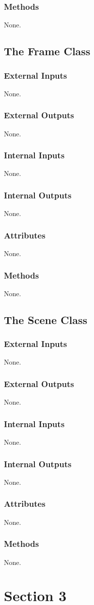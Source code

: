 \documentclass[]{DINOReportMemo}
\begin{document}
\subsubsection{Methods}
None.

\subsection{The Frame Class}
\subsubsection{External Inputs}
None.
\subsubsection{External Outputs}
None.
\subsubsection{Internal Inputs}
None.
\subsubsection{Internal Outputs}
None.
\subsubsection{Attributes}
None.
\subsubsection{Methods}
None.

\subsection{The Scene Class}
\subsubsection{External Inputs}
None.
\subsubsection{External Outputs}
None.
\subsubsection{Internal Inputs}
None.
\subsubsection{Internal Outputs}
None.
\subsubsection{Attributes}
None.
\subsubsection{Methods}
None.
\section{Section 3}
\end{document}

